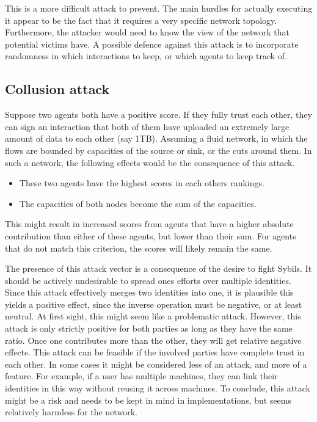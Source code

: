 \documentclass[a4paper,11pt]{book}
\theoremstyle{definition}
\begin{document}
This is a more difficult attack to prevent. The main hurdles for actually executing it appear to be
the fact that it requires a very specific network topology. Furthermore, the attacker would need to
know the view of the network that potential victims have. A possible defence against this attack is
to incorporate randomness in which interactions to keep, or which agents to keep track of.

\subsection{Collusion attack}

Suppose two agents both have a positive score. If they 
fully trust each other, they can sign an interaction that both of them have uploaded an extremely large
amount of data to each other (say 1TB). Assuming a fluid network,
in which the flows are bounded by capacities of the source or sink, or the cuts around them.
In such a network, the following effects would be the consequence of this attack.

\begin{itemize}
    \item These two agents have the highest scores in each others rankings. 
    \item The capacities of both nodes become the sum of the capacities.
\end{itemize}

This might result in increased scores from agents that have a higher absolute contribution
than either of these agents, but lower than their sum. For agents that do not match this
criterion, the scores will likely remain the same.

The presence of this attack vector is a consequence of the desire to fight Sybils. It should be
actively undesirable to spread ones efforts over multiple identities. Since this attack 
effectively merges two identities into one, it is plausible this yields a positive effect,
since the inverse operation must be negative, or at least neutral. At first sight, this
might seem like a problematic attack. However, this attack is only strictly positive for both parties as long
as they have the same ratio. Once one contributes more than the other, they will get relative negative
effects. This attack can be feasible if the involved parties have complete trust in each other. In some
cases it might be considered less of an attack, and more of a feature. For example, if a user
has multiple machines, they can link their identities in this way without reusing it across machines.
To conclude, this attack might be a risk and needs to be kept in mind in implementations, but seems relatively
harmless for the network.
\end{document}

